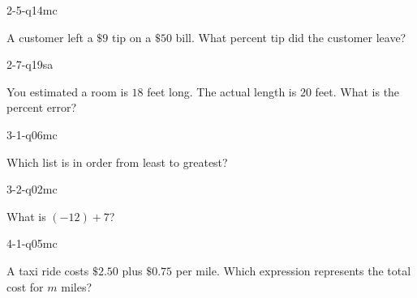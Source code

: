 \begin{practiceQuestion}{2-5-q14}{mc}
\begin{questionText}
A customer left a $\$9$ tip on a $\$50$ bill. What percent tip did the customer leave?


\end{questionText}
\end{practiceQuestion}

\begin{practiceQuestion}{2-7-q19}{sa}
\begin{questionText}
You estimated a room is $18$ feet long. The actual length is $20$ feet. What is the percent error?
\end{questionText}
\end{practiceQuestion}

\begin{practiceQuestion}{3-1-q06}{mc}
\begin{questionText}
Which list is in order from least to greatest?
\end{questionText}
\end{practiceQuestion}

\begin{practiceQuestion}{3-2-q02}{mc}
\begin{questionText}
What is $(-12) + 7$?
\end{questionText}
\end{practiceQuestion}

\begin{practiceQuestion}{4-1-q05}{mc}
\begin{questionText}
A taxi ride costs $\$2.50$ plus $\$0.75$ per mile. Which expression represents the total cost for $m$ miles?
\end{questionText}
\end{practiceQuestion}

